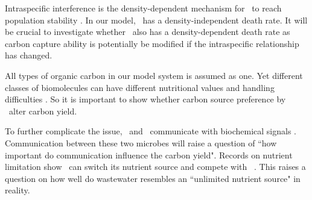 \documentclass[../thesis.tex]{subfiles} %
\begin{document}
Intraspecific interference is the density-dependent mechanism for \phy\ to reach population stability \autocite{o2017unexpected,savage2004effects,allen2007recasting,bernhardt2018metabolic}.  In our model, \bac\ has a density-independent death rate.  It will be crucial to investigate whether \bac\ also has a density-dependent death rate as carbon capture ability is potentially be modified if the intraspecific relationship has changed.

All types of organic carbon in our model system is assumed as one.  Yet different classes of biomolecules can have different nutritional values and handling difficulties \autocite{amon1996bacterial}.  So it is important to show whether carbon source preference by \bac\ alter carbon yield.

To further complicate the issue, \phy\ and \bac\ communicate with biochemical signals \autocite{beliaev2014inference,amin2012interactions}.  Communication between these two microbes will raise a question of ``how important do communication influence the carbon yield".  Records on nutrient limitation show \bac\ can switch its nutrient source and compete with \phy\ \autocite{danger2007bacteria}.  This raises a question on how well do wastewater resembles an ``unlimited nutrient source" in reality.
\end{document}
